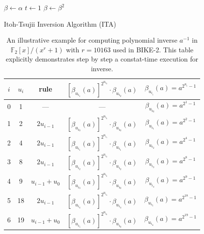 \documentclass[runningheads]{llncs}
\begin{document}
\begin{algorithm}[!tb]
\DontPrintSemicolon %
$\beta \gets \alpha$ \;
$t \gets 1$ \;
 $\beta \gets \beta ^2$ \;
\Return {$\beta$}


\caption{Itoh-Tsujii Inversion Algorithm (ITA) \cite{hu2015fast}}
\label{algo:ITA}
\end{algorithm}

\begin{table}[!tb]\centering
\caption{An illustrative example for computing polynomial inverse $a^{-1}$ in $\mathbb{F}_2[x]/(x^r+1)$ with $r=10163$ used in BIKE-2. This table explicitly demonstrates step by step a constat-time execution for inverse.}\scriptsize
\label{table:ita_example}
\begin{tabular}{ccccc}
  \hline
  $i$ & $u_i$ & rule & $[\beta_{u_{i_1}}(a)]^{2^{u_{i_2}}}\cdot \beta_{u_{i_2}}(a)$ & $\beta_{u_{i_i}}(a)=a^{2^{u_i}-1}$\\
  \hline
  0   & 1       & --- & ---                                                         & $\beta_{u_{i_0}}(a)=a^{2^{1}-1}$\\
  1   & 2       & $2u_{i-1}$ &$[\beta_{u_{i_0}}(a)]^{2^{u_{i_0}}}\cdot \beta_{u_{i_0}}(a)$ & $\beta_{u_{i_1}}(a)=a^{2^{2}-1}$\\
  2   & 4       & $2u_{i-1}$ &$[\beta_{u_{i_1}}(a)]^{2^{u_{i_1}}}\cdot \beta_{u_{i_1}}(a)$ & $\beta_{u_{i_2}}(a)=a^{2^{4}-1}$\\
  3   & 8       & $2u_{i-1}$ &$[\beta_{u_{i_2}}(a)]^{2^{u_{i_2}}}\cdot \beta_{u_{i_2}}(a)$ & $\beta_{u_{i_3}}(a)=a^{2^{8}-1}$\\
  4   & 9  & $u_{i-1}+u_0$   &$[\beta_{u_{i_3}}(a)]^{2^{u_{i_0}}}\cdot \beta_{u_{i_0}}(a)$ & $\beta_{u_{i_4}}(a)=a^{2^{9}-1}$\\
  5   & 18       & $2u_{i-1}$ &$[\beta_{u_{i_4}}(a)]^{2^{u_{i_4}}}\cdot \beta_{u_{i_4}}(a)$ & $\beta_{u_{i_5}}(a)=a^{2^{18}-1}$\\
  6   & 19  & $u_{i-1}+u_0$   &$[\beta_{u_{i_5}}(a)]^{2^{u_{i_0}}}\cdot \beta_{u_{i_0}}(a)$ & $\beta_{u_{i_4}}(a)=a^{2^{19}-1}$\\

\end{tabular}
\end{table}
\end{document}
